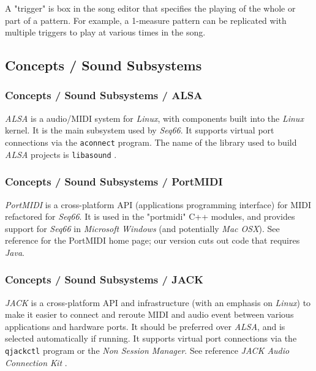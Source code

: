    A "trigger" is box in the song editor that specifies the playing of
   the whole or part of a pattern.
   For example, a 1-measure pattern can be replicated with multiple triggers
   to play at various times in the song.

\subsection{Concepts / Sound Subsystems}
\label{subsec:concepts_sound_subsystems}

\subsubsection{Concepts / Sound Subsystems / ALSA}
\label{subsubsec:concepts_sound_alsa}

   \textsl{ALSA} is a audio/MIDI system for \textsl{Linux}, with components built
   into the \textsl{Linux} kernel. It is the main subsystem used by
   \textsl{Seq66}.
   It supports virtual port connections via the \texttt{aconnect} program.
   The name of the library used to build
   \textsl{ALSA} projects is \texttt{libasound} \cite{alsa}.

\subsubsection{Concepts / Sound Subsystems / PortMIDI}
\label{subsubsec:concepts_sound_portmidi}

   \textsl{PortMIDI} is a cross-platform API (applications programming
   interface) for MIDI refactored for \textsl{Seq66}.
   It is used in the "portmidi" C++ modules, and provides support for
   \textsl{Seq66} in \textsl{Microsoft Windows} (and potentially
   \textsl{Mac OSX}).
   See reference \cite{portmidi} for the PortMIDI home page; our version
   cuts out code that requires \textsl{Java}.

\subsubsection{Concepts / Sound Subsystems / JACK}
\label{subsubsec:concepts_sound_jack}

   \textsl{JACK} is a cross-platform
   API and infrastructure
   (with an emphasis on \textsl{Linux})
   to make it easier to connect and reroute MIDI
   and audio event between various applications and hardware ports.
   It should be preferred over \textsl{ALSA}, and is selected automatically if
   running.
   It supports virtual port connections via the \texttt{qjackctl} program or
   the \textsl{Non Session Manager}.
   See reference \textsl{JACK Audio Connection Kit} \cite{jack}.

